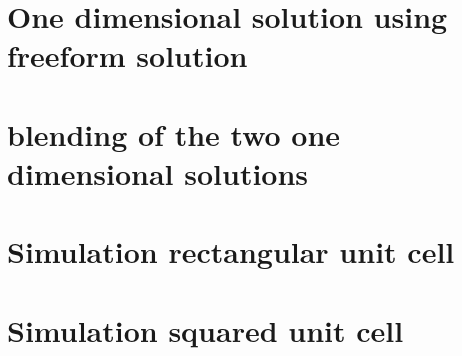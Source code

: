 \section{One dimensional solution using freeform solution}

\section{blending of the two one dimensional solutions}

\section{Simulation rectangular unit cell}

\section{Simulation squared unit cell}